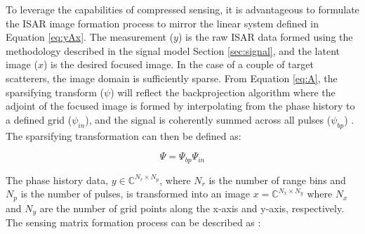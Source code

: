 \documentclass[conference]{IEEEtran}
\begin{document}
To leverage the capabilities of compressed sensing, it is advantageous to formulate the ISAR image formation process to mirror the linear system defined in Equation \ref{eq:yAx}. The measurement ($y$) is the raw ISAR data formed using the methodology described in the signal model Section \ref{sec:signal}, and the latent image ($x$) is the desired focused image. In the case of a couple of target scatterers, the image domain is sufficiently sparse. From Equation \ref{eq:A}, the sparsifying transform ($\psi$) will reflect the backprojection algorithm where the adjoint of the focused image is formed by interpolating from the phase history to a defined grid ($\psi_{in}$), and the signal is coherently summed across all pulses ($\psi_{bp}$) \cite{Focsa_2021, Bonfert_2024}. The sparsifying transformation can then be defined as:

\begin{equation}
    \Psi = \Psi_{bp} \Psi_{in}
\end{equation}

The phase history data, $y \in  \mathbb{C}^{N_{r} \times N_{p}}$, where $N_{r}$ is the number of range bins and $N_{p}$ is the number of pulses, is transformed into an image $x = \mathbb{C}^{N_{x} \times N_{y}}$ where $N_{x}$ and $N_{y}$ are the number of grid points along the x-axis and y-axis, respectively. The sensing matrix formation process can be described as \cite{Focsa_2021}: 
\end{document}
